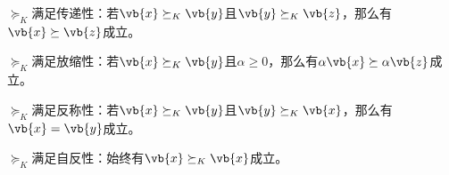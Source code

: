 \begin{BoxProperty}[广义不等式的传递性]
    $\succeq_{K}$满足传递性：若$\vb{x}\succeq_{K}\vb{y}$且$\vb{y}\succeq_{K}\vb{z}$，那么有$\vb{x}\succeq \vb{z}$成立。
\end{BoxProperty}

\begin{BoxProperty}[广义不等式的放缩性]
    $\succeq_{K}$满足放缩性：若$\vb{x}\succeq_{K}\vb{y}$且$\alpha\geq 0$，那么有$\alpha \vb{x}\succeq \alpha \vb{z}$成立。
\end{BoxProperty}

\begin{BoxProperty}[广义不等式的反称性]
    $\succeq_{K}$满足反称性：若$\vb{x}\succeq_{K}\vb{y}$且$\vb{y}\succeq_{K}\vb{x}$，那么有$\vb{x}=\vb{y}$成立。
\end{BoxProperty}

\begin{BoxProperty}[广义不等式的自反性]
    $\succeq_{K}$满足自反性：始终有$\vb{x}\succeq_{K}\vb{x}$成立。
\end{BoxProperty}
